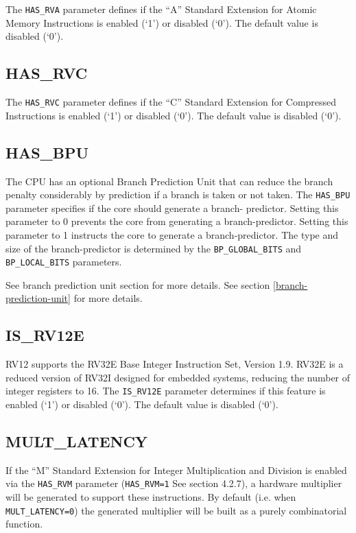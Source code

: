 The \texttt{HAS\_RVA} parameter defines if the ``A'' Standard Extension for
Atomic Memory Instructions is enabled (`1') or disabled (`0'). The
default value is disabled (`0').

\subsection{HAS\_RVC}\label{has_rvc}

The \texttt{HAS\_RVC} parameter defines if the ``C'' Standard Extension for
Compressed Instructions is enabled (`1') or disabled (`0'). The default
value is disabled (`0').

\subsection{HAS\_BPU}\label{has_bpu}

The CPU has an optional Branch Prediction Unit that can reduce the branch
penalty considerably by prediction if a branch is taken or not taken. The
\texttt{HAS\_BPU} parameter specifies if the core should generate a branch-
predictor. Setting this parameter to 0 prevents the core from generating a
branch-predictor. Setting this parameter to 1 instructs the core to generate a
branch-predictor. The type and size of the branch-predictor is determined by the
\texttt{BP\_GLOBAL\_BITS} and \texttt{BP\_LOCAL\_BITS} parameters.

\ifdefined\MARKDOWN
See branch prediction unit section for more details.
\else
See section \ref{branch-prediction-unit}  for more details.
\fi

\subsection{IS\_RV12E}\label{is_rv12e}

RV12 supports the RV32E Base Integer Instruction Set, Version 1.9. RV32E is a
reduced version of RV32I designed for embedded systems, reducing the number of
integer registers to 16. The \texttt{IS\_RV12E} parameter determines if this
feature is enabled (`1') or disabled (`0'). The default value is disabled (`0').

\subsection{MULT\_LATENCY}\label{mult_latency}

If the ``M'' Standard Extension for Integer Multiplication and Division is
enabled via the \texttt{HAS\_RVM} parameter (\texttt{HAS\_RVM=1} See
section 4.2.7), a hardware multiplier will be generated to support these
instructions. By default (i.e. when \texttt{MULT\_LATENCY=0}) the generated
multiplier will be built as a purely combinatorial function.


